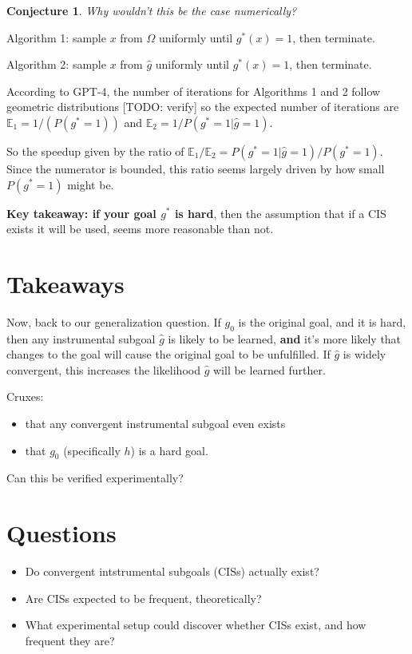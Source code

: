\documentclass{article}
\newtheorem{conjecture}{Conjecture}
\begin{document}
\begin{conjecture}
Why wouldn't this be the case numerically?
\end{conjecture}

Algorithm 1: sample $x$ from $\Omega$ uniformly until $g^*(x)=1$, then terminate.

Algorithm 2: sample $x$ from $\hat{g}$ uniformly until $g^*(x)=1$, then terminate.

According to GPT-4, the number of iterations for Algorithms 1 and 2 follow geometric distributions [TODO: verify] so the expected number of iterations are $\mathbb{E}_1 = 1/(P(g^*=1))$ and $\mathbb{E}_2 = 1/P(g^*=1|\hat{g}=1)$.

So the speedup given by the ratio of $\mathbb{E}_1 / \mathbb{E}_2 = P(g^*=1|\hat{g}=1)/P(g^*=1)$. Since the numerator is bounded, this ratio seems largely driven by how small $P(g^*=1)$ might be.

\textbf{Key takeaway: if your goal $g^*$ is hard}, then the assumption that if a CIS exists it will be used, seems more reasonable than not.

\section{Takeaways}
Now, back to our generalization question. If $g_0$ is the original goal, and it is hard, then any instrumental subgoal $\hat{g}$ is likely to be learned, \textbf{and} it's more likely that changes to the goal will cause the original goal to be unfulfilled. If $\hat{g}$ is widely convergent, this increases the likelihood $\hat{g}$ will be learned further.

Cruxes:
\begin{itemize}
    \item that any convergent instrumental subgoal even exists
    \item that $g_0$ (specifically $h$) is a hard goal.
\end{itemize}

Can this be verified experimentally?


\section*{Questions}
\begin{itemize}
    \item Do convergent intstrumental subgoals (CISs) actually exist? 
    \item Are CISs expected to be frequent, theoretically?
    \item What experimental setup could discover whether CISs exist, and how frequent they are?
\end{itemize}
\end{document}
